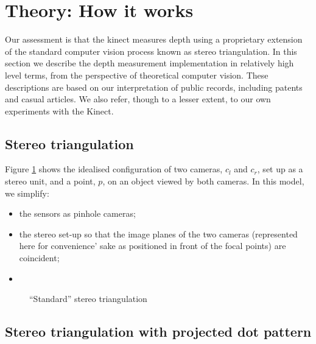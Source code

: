 \section{Theory: How it works}
\label{howitworks}

Our assessment is that the kinect measures depth using a proprietary extension
of the standard computer vision process known as stereo triangulation. In this
section we describe the depth measurement implementation in relatively high
level terms, from the perspective of theoretical computer vision. These
descriptions are based on our interpretation of public records, including
patents and casual articles. We also refer, though to a lesser extent, to our
own experiments with the Kinect.


\subsection{Stereo triangulation}

Figure \ref{fig:triang} shows the idealised configuration of two cameras,
$c_{l}$ and $c_{r}$, set up as a stereo unit, and a point, $p$, on an object
viewed by both cameras.  In this model, we simplify: 

\begin{itemize}

    \item   the sensors as pinhole cameras;

    \item   the stereo set-up so that the image planes of the two cameras
            (represented here for convenience' sake as positioned in front of
            the focal points) are coincident;

    \item   


\end{itemize}

\begin{figure}[ht]
    \begin{center}
        
        \caption{``Standard'' stereo triangulation}
        \label{fig:triang}
    \end{center}
\end{figure}


\subsection{Stereo triangulation with projected dot pattern}

